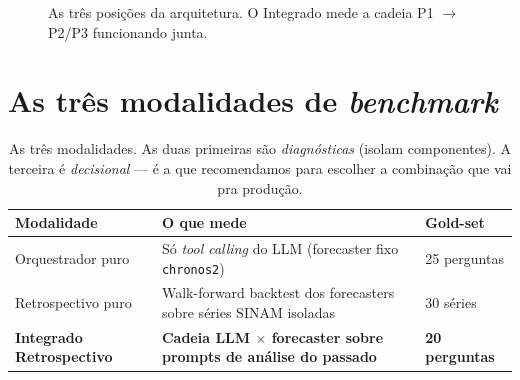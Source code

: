 \documentclass[11pt,a4paper]{article}
\newcommand{\code}[1]{\texttt{\small #1}}
\begin{document}
\begin{figure}[h!]
\centering
{}
\caption{As três posições da arquitetura. O Integrado mede a cadeia
P1 $\to$ P2/P3 funcionando junta.}
\label{fig:arch}
\end{figure}

\section{As três modalidades de \emph{benchmark}}

\begin{table}[h!]
\centering
\small
\begin{tabularx}{\textwidth}{@{}l X l@{}}
\toprule
\textbf{Modalidade} & \textbf{O que mede} & \textbf{Gold-set} \\
\midrule
Orquestrador puro & Só \emph{tool calling} do LLM (forecaster fixo
              \code{chronos2}) & 25 perguntas \\
Retrospectivo puro & Walk-forward backtest dos forecasters sobre
              séries SINAM isoladas & 30 séries \\
\textbf{Integrado Retrospectivo} & \textbf{Cadeia LLM $\times$ forecaster
              sobre prompts de análise do passado} & \textbf{20 perguntas} \\
\bottomrule
\end{tabularx}
\caption{As três modalidades. As duas primeiras são \emph{diagnósticas}
(isolam componentes). A terceira é \emph{decisional} --- é a que
recomendamos para escolher a combinação que vai pra produção.}
\end{table}
\end{document}
